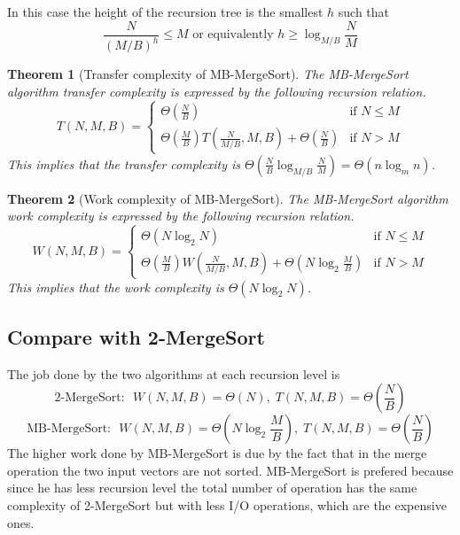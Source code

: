 \documentclass{report}
\newtheorem{teo}{Theorem}[chapter]
\begin{document}
\noindent
In this case the height of the recursion tree is the smallest \(h\) such that
\begin{equation}
    \frac{N}{\left(M/B\right)^h} \leq M \text{ or equivalently } h \geq \log_{M/B} \frac{N}{M}
\end{equation}
\begin{teo}[Transfer complexity of MB-MergeSort]
    The MB-MergeSort algorithm transfer complexity is expressed by the following recursion relation.
    \begin{equation}
        T(N,M,B) = \begin{cases}
            \Theta (\frac{N}{B}) & \text{if } N \leq M \\
            \Theta (\frac{M}{B}) T\left( \frac{N}{M/B},M,B\right) + \Theta(\frac{N}{B}) & \text{if } N > M
        \end{cases}
    \end{equation}
    This implies that the transfer complexity is \(\Theta(\frac{N}{B} \log_{M/B} \frac{N}{M}) = \Theta(n \log_m n)\).
\end{teo}
\begin{teo}[Work complexity of MB-MergeSort]
    The MB-MergeSort algorithm work complexity is expressed by the following recursion relation.
    \begin{equation}
        W(N,M,B) = \begin{cases}
            \Theta (N \log_2 N) & \text{if } N \leq M \\
            \Theta (\frac{M}{B}) W\left( \frac{N}{M/B},M,B\right) + \Theta(N \log_2 \frac{M}{B}) & \text{if } N > M
        \end{cases}
    \end{equation}
    This implies that the work complexity is \(\Theta(N \log_2 N)\).
\end{teo}
\subsection{Compare with 2-MergeSort}
The job done by the two algorithms at each recursion level is
\[
    \text{2-MergeSort: }\,\, W(N,M,B) = \Theta(N),\; T(N,M,B) = \Theta(\frac{N}{B})
\]
\[
    \text{MB-MergeSort: }\,\, W(N,M,B) = \Theta(N \log_2 \frac{M}{B}),\; T(N,M,B) = \Theta(\frac{N}{B})
\]
The higher work done by MB-MergeSort is due by the fact that in the merge operation the two input vectors are not sorted. MB-MergeSort is prefered because since he has less recursion level the total number of operation has the same complexity of 2-MergeSort but with less I/O operations, which are the expensive ones.
\end{document}

